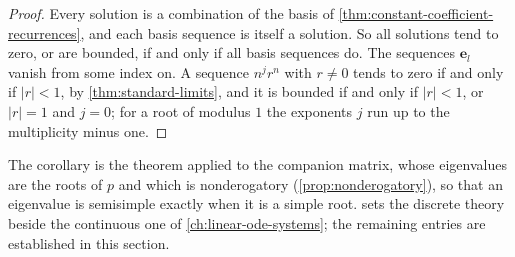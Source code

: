 \begin{proof}
Every solution is a combination of the basis of \cref{thm:constant-coefficient-recurrences}, and each basis sequence is itself a solution. So all solutions tend to zero, or are bounded, if and only if all basis sequences do. The sequences $\mathbf e_l$ vanish from some index on. A sequence $n^jr^n$ with $r\ne0$ tends to zero if and only if $|r|<1$, by \cref{thm:standard-limits}, and it is bounded if and only if $|r|<1$, or $|r|=1$ and $j=0$; for a root of modulus $1$ the exponents $j$ run up to the multiplicity minus one.
\end{proof}

The corollary is the theorem applied to the companion matrix, whose eigenvalues are the roots of $p$ and which is nonderogatory (\cref{prop:nonderogatory}), so that an eigenvalue is semisimple exactly when it is a simple root.  sets the discrete theory beside the continuous one of \cref{ch:linear-ode-systems}; the remaining entries are established in this section.

\begin{table}
\end{table}

